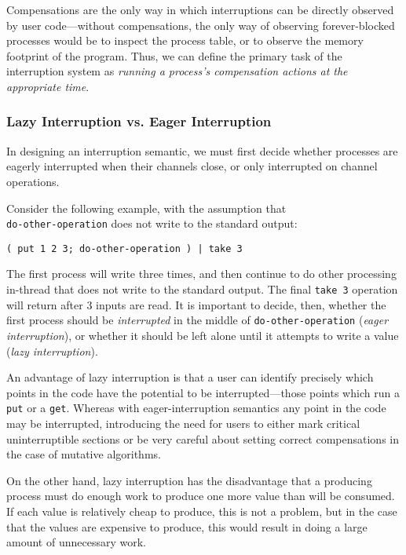 \documentclass[english,PRO]{ipsj}
\begin{document}
Compensations are the only way in which interruptions can be directly observed by user code---without compensations, the only way of observing forever-blocked processes would be to inspect the process table, or to observe the memory footprint of the program. Thus, we can define the primary task of the interruption system as \emph{running a process's compensation actions at the appropriate time}.

\subsubsection{Lazy Interruption vs. Eager Interruption}\label{lazy-interruption}\noindent
In designing an interruption semantic, we must first decide whether processes are eagerly interrupted when their channels close, or only interrupted on channel operations.

Consider the following example, with the assumption that \\ \verb/do-other-operation/ does not write to the standard output:
\begin{lstlisting}
( put 1 2 3; do-other-operation ) | take 3
\end{lstlisting}

\noindent
The first process will write three times, and then continue to do other processing in-thread that does not write to the standard output.
The final \verb/take 3/ operation will return after 3 inputs are read.
It is important to decide, then, whether the first process should be \emph{interrupted} in the middle of \verb/do-other-operation/ (\emph{eager interruption}), or whether it should be left alone until it attempts to write a value (\emph{lazy interruption}).

An advantage of lazy interruption is that a user can identify precisely which points in the code have the potential to be interrupted---those points which run a \verb/put/ or a \verb/get/. Whereas with eager-interruption semantics any point in the code may be interrupted, introducing the need for users to either mark critical uninterruptible sections or be very careful about setting correct compensations in the case of mutative algorithms.

On the other hand, lazy interruption has the disadvantage that a producing process must do enough work to produce one more value than will be consumed. If each value is relatively cheap to produce, this is not a problem, but in the case that the values are expensive to produce, this would result in doing a large amount of unnecessary work.
\end{document}
